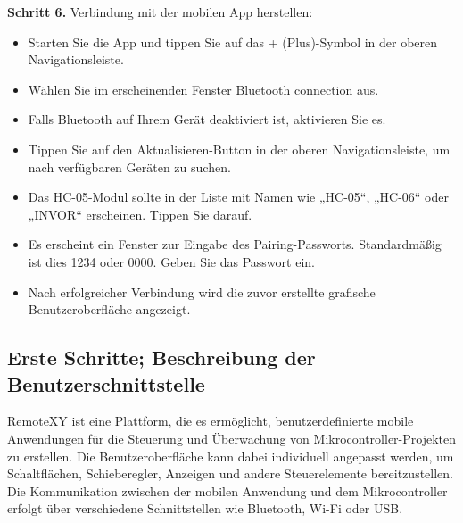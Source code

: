 \vspace{1\baselineskip}

\textbf{Schritt 6.} Verbindung mit der mobilen App herstellen:
\cite{RemoteXY:Install}

\begin{itemize}
    \item Starten Sie die App und tippen Sie auf das + (Plus)-Symbol in der oberen Navigationsleiste.
    
    \item Wählen Sie im erscheinenden Fenster Bluetooth connection aus.
    
    \item Falls Bluetooth auf Ihrem Gerät deaktiviert ist, aktivieren Sie es.
    
    \item Tippen Sie auf den Aktualisieren-Button in der oberen Navigationsleiste, um nach verfügbaren Geräten zu suchen.
    
    \item Das HC-05-Modul sollte in der Liste mit Namen wie „HC-05“, „HC-06“ oder „INVOR“ erscheinen. Tippen Sie darauf.
    
    \item Es erscheint ein Fenster zur Eingabe des Pairing-Passworts. Standardmäßig ist dies 1234 oder 0000. Geben Sie das Passwort ein.
    
    \item Nach erfolgreicher Verbindung wird die zuvor erstellte grafische Benutzeroberfläche angezeigt.
\end{itemize}	

\subsection{Erste Schritte; Beschreibung der Benutzerschnittstelle}
RemoteXY ist eine Plattform, die es ermöglicht, benutzerdefinierte mobile Anwendungen für die Steuerung und Überwachung von Mikrocontroller-Projekten zu erstellen. Die Benutzeroberfläche kann dabei individuell angepasst werden, um Schaltflächen, Schieberegler, Anzeigen und andere Steuerelemente bereitzustellen. Die Kommunikation zwischen der mobilen Anwendung und dem Mikrocontroller erfolgt über verschiedene Schnittstellen wie Bluetooth, Wi-Fi oder USB.
\cite{RemoteXY:Start}

